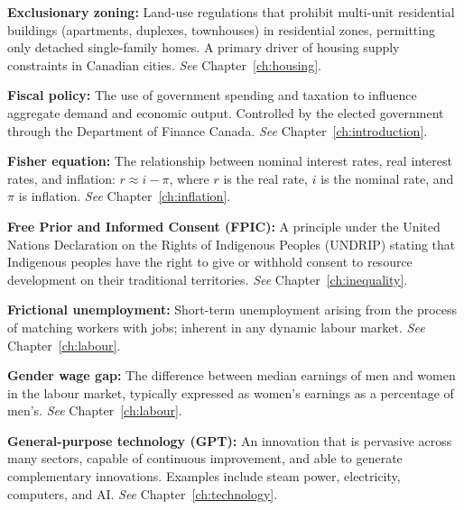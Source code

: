 \vspace{6pt}
\noindent\textbf{Exclusionary zoning:} Land-use regulations that prohibit multi-unit residential buildings (apartments, duplexes, townhouses) in residential zones, permitting only detached single-family homes. A primary driver of housing supply constraints in Canadian cities. \textit{See} Chapter~\ref{ch:housing}.

\vspace{6pt}
\noindent\textbf{Fiscal policy:} The use of government spending and taxation to influence aggregate demand and economic output. Controlled by the elected government through the Department of Finance Canada. \textit{See} Chapter~\ref{ch:introduction}.

\vspace{6pt}
\noindent\textbf{Fisher equation:} The relationship between nominal interest rates, real interest rates, and inflation: $r \approx i - \pi$, where $r$ is the real rate, $i$ is the nominal rate, and $\pi$ is inflation. \textit{See} Chapter~\ref{ch:inflation}.

\vspace{6pt}
\noindent\textbf{Free Prior and Informed Consent (FPIC):} A principle under the United Nations Declaration on the Rights of Indigenous Peoples (UNDRIP) stating that Indigenous peoples have the right to give or withhold consent to resource development on their traditional territories. \textit{See} Chapter~\ref{ch:inequality}.

\vspace{6pt}
\noindent\textbf{Frictional unemployment:} Short-term unemployment arising from the process of matching workers with jobs; inherent in any dynamic labour market. \textit{See} Chapter~\ref{ch:labour}.

\vspace{6pt}
\noindent\textbf{Gender wage gap:} The difference between median earnings of men and women in the labour market, typically expressed as women's earnings as a percentage of men's. \textit{See} Chapter~\ref{ch:labour}.

\vspace{6pt}
\noindent\textbf{General-purpose technology (GPT):} An innovation that is pervasive across many sectors, capable of continuous improvement, and able to generate complementary innovations. Examples include steam power, electricity, computers, and AI. \textit{See} Chapter~\ref{ch:technology}.

